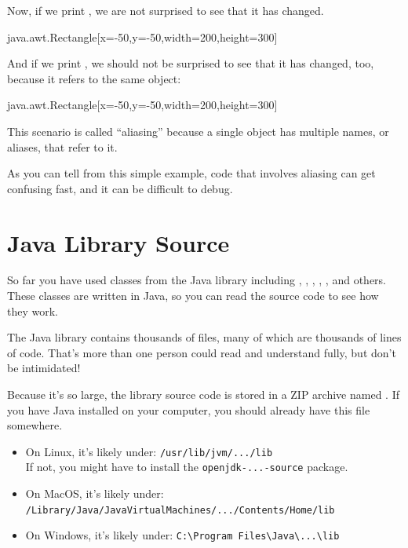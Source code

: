 Now, if we print , we are not surprised to see that it has changed.

\begin{code}
java.awt.Rectangle[x=-50,y=-50,width=200,height=300]
\end{code}

And if we print , we should not be surprised to see that it has changed, too, because it refers to the same object:

\begin{code}
java.awt.Rectangle[x=-50,y=-50,width=200,height=300]
\end{code}

This scenario is called ``aliasing'' because a single object has multiple names, or aliases, that refer to it.

As you can tell from this simple example, code that involves aliasing can get confusing fast, and it can be difficult to debug.


\section{Java Library Source}
\label{src.zip}


So far you have used classes from the Java library including , , , , , and others.
These classes are written in Java, so you can read the source code to see how they work.


The Java library contains thousands of files, many of which are thousands of lines of code.
That's more than one person could read and understand fully, but don't be intimidated!

Because it's so large, the library source code is stored in a ZIP archive named .
If you have Java installed on your computer, you should already have this file somewhere.

\begin{itemize}
\item On Linux, it's likely under: \verb"/usr/lib/jvm/.../lib"
\\ If not, you might have to install the {\tt openjdk-...-source} package.

\item On MacOS, it's likely under: \\ \verb"/Library/Java/JavaVirtualMachines/.../Contents/Home/lib"

\item On Windows, it's likely under: \verb"C:\Program Files\Java\...\lib"
\end{itemize}

